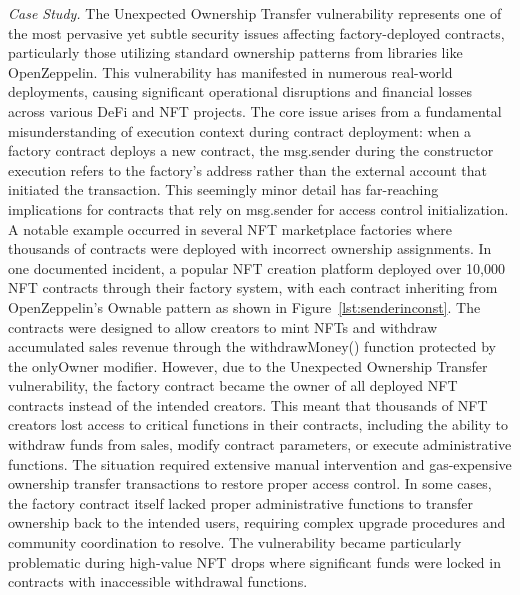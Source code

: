 \documentclass[acmsmall, screen]{acmart}
\begin{document}
	\textit{Case Study.} The Unexpected Ownership Transfer vulnerability represents one of the most pervasive
	yet subtle security issues affecting factory-deployed contracts, particularly those utilizing
	standard ownership patterns from libraries like OpenZeppelin. This vulnerability has manifested in
	numerous real-world deployments, causing significant operational disruptions and financial
	losses across various DeFi and NFT projects. The core issue arises from a fundamental misunderstanding
	of execution context during contract deployment: when a factory contract deploys a new contract,
	the msg.sender during the constructor execution refers to the factory's address rather than the external
	account that initiated the transaction. This seemingly minor detail has far-reaching
	implications for contracts that rely on msg.sender for access control initialization. A notable example
	occurred in several NFT marketplace factories where thousands of contracts were deployed with incorrect
	ownership assignments. In one documented incident, a popular NFT creation platform deployed over
	10,000 NFT contracts through their factory system, with each contract inheriting from
	OpenZeppelin's Ownable pattern as shown in Figure~\ref{lst:senderinconst}. The contracts were designed
	to allow creators to mint NFTs and withdraw accumulated sales revenue through the withdrawMoney()
	function protected by the onlyOwner modifier. However, due to the Unexpected Ownership Transfer vulnerability,
	the factory contract became the owner of all deployed NFT contracts instead of the intended
	creators. This meant that thousands of NFT creators lost access to critical functions in their contracts,
	including the ability to withdraw funds from sales, modify contract parameters, or execute
	administrative functions. The situation required extensive manual intervention and gas-expensive
	ownership transfer transactions to restore proper access control. In some cases, the factory contract
	itself lacked proper administrative functions to transfer ownership back to the intended users,
	requiring complex upgrade procedures and community coordination to resolve. The vulnerability became
	particularly problematic during high-value NFT drops where significant funds were locked in contracts
	with inaccessible withdrawal functions.
\end{document}
